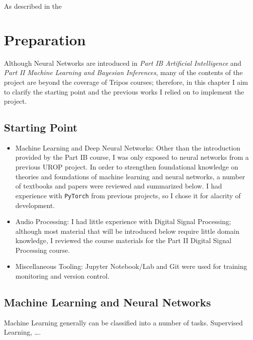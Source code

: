 \documentclass[12pt,a4paper,]{report}
\begin{document}
As described in the

\hypertarget{preparation}{%
\chapter{Preparation}\label{preparation}}

Although Neural Networks are introduced in \emph{Part IB Artificial
Intelligence} and \emph{Part II Machine Learning and Bayesian
Inferences}, many of the contents of the project are beyond the coverage
of Tripos courses; therefore, in this chapter I aim to clarify the
starting point and the previous works I relied on to implement the
project.

\hypertarget{starting-point}{%
\section{Starting Point}\label{starting-point}}

\begin{itemize}
\item
  Machine Learning and Deep Neural Networks: Other than the introduction
  provided by the Part IB course, I was only exposed to neural networks
  from a previous UROP project. In order to strengthen foundational
  knowledge on theories and foundations of machine learning and neural
  networks, a number of textbooks and papers were reviewed and
  summarized below. I had experience with \texttt{PyTorch} from previous
  projects, so I chose it for alacrity of development.
\item
  Audio Processing: I had little experience with Digital Signal
  Processing; although most material that will be introduced below
  require little domain knowledge, I reviewed the course materials for
  the Part II Digital Signal Processing course.
\item
  Miscellaneous Tooling: Jupyter Notebook/Lab and Git were used for
  training monitoring and version control.
\end{itemize}

\hypertarget{machine-learning-and-neural-networks}{%
\section{Machine Learning and Neural
Networks}\label{machine-learning-and-neural-networks}}

Machine Learning generally can be classified into a number of tasks.
Supervised Learning, \ldots{}.
\end{document}
